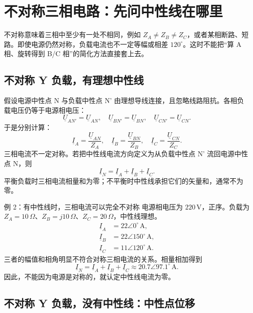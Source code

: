 \documentclass[circuit]{CarlosTexRpt}
\newcommand{\phas}[1]{\underline{#1}}
\newcommand{\dgr}{^\circ}
\begin{document}
\section{不对称三相电路：先问中性线在哪里}

不对称意味着三相中至少有一处不相同，例如 \(Z_A\ne Z_B\ne Z_C\)，或者某相断路、短路。即使电源仍然对称，负载电流也不一定等幅或相差 \(120^\circ\)。这时不能把“算 A 相、旋转得到 B/C 相”的简化方法直接套上去。

\subsection{不对称 Y 负载，有理想中性线}

假设电源中性点 N 与负载中性点 N' 由理想导线连接，且忽略线路阻抗。各相负载电压仍等于电源相电压：
\begin{equation}
  \phas U_{AN'}=\phas U_{AN},\quad
  \phas U_{BN'}=\phas U_{BN},\quad
  \phas U_{CN'}=\phas U_{CN}.
\end{equation}
于是分别计算：
\begin{equation}
  \phas I_A=\frac{\phas U_{AN}}{Z_A},\quad
  \phas I_B=\frac{\phas U_{BN}}{Z_B},\quad
  \phas I_C=\frac{\phas U_{CN}}{Z_C}.
\end{equation}
三相电流不一定对称。若把中性线电流方向定义为从负载中性点 N' 流回电源中性点 N，则
\begin{equation}
  \boxed{\phas I_N=\phas I_A+\phas I_B+\phas I_C}.
\end{equation}
平衡负载时三相电流相量和为零；不平衡时中性线承担它们的矢量和，通常不为零。

\begin{examplebox}{例 2：有中性线时，三相电流可以完全不对称}
电源相电压为 \(220\,\mathrm V\)，正序。负载为 \(Z_A=10\,\Omega\)、\(Z_B=j10\,\Omega\)、\(Z_C=20\,\Omega\)，中性线理想。
\[
\begin{aligned}
  \phas I_A&=22\angle0\dgr\,\mathrm A,\\
  \phas I_B&=22\angle150\dgr\,\mathrm A,\\
  \phas I_C&=11\angle120\dgr\,\mathrm A.
\end{aligned}
\]
三者的幅值和相角明显不符合对称三相电流的关系。相量相加得到
\[
  \phas I_N=\phas I_A+\phas I_B+\phas I_C
  \approx20.7\angle97.1\dgr\,\mathrm A.
\]
因此，不能因为电源是对称的，就认定中性线电流为零。
\end{examplebox}

\subsection{不对称 Y 负载，没有中性线：中性点位移}
\end{document}
